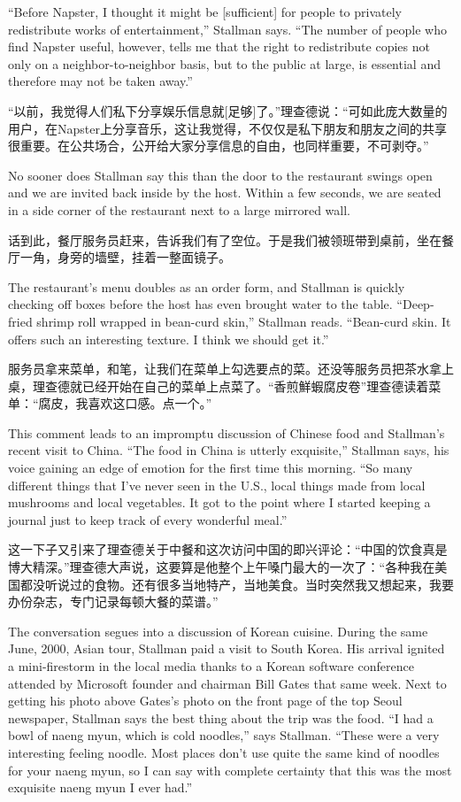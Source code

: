 \ifdefined\eng
``Before Napster, I thought it might be [sufficient] for people to privately redistribute works of entertainment,'' Stallman says. ``The number of people who find Napster useful, however, tells me that the right to redistribute copies not only on a neighbor-to-neighbor basis, but to the public at large, is essential and therefore may not be taken away.''
\fi

\ifdefined\chs
“以前，我觉得人们私下分享娱乐信息就[足够]了。”理查德说：“可如此庞大数量的用户，在Napster上分享音乐，这让我觉得，不仅仅是私下朋友和朋友之间的共享很重要。在公共场合，公开给大家分享信息的自由，也同样重要，不可剥夺。”
\fi

\ifdefined\eng
No sooner does Stallman say this than the door to the restaurant swings open and we are invited back inside by the host. Within a few seconds, we are seated in a side corner of the restaurant next to a large mirrored wall.
\fi

\ifdefined\chs
话到此，餐厅服务员赶来，告诉我们有了空位。于是我们被领班带到桌前，坐在餐厅一角，身旁的墙壁，挂着一整面镜子。
\fi

\ifdefined\eng
The restaurant's menu doubles as an order form, and Stallman is quickly checking off boxes before the host has even brought water to the table. ``Deep-fried shrimp roll wrapped in bean-curd skin,'' Stallman reads. ``Bean-curd skin. It offers such an interesting texture. I think we should get it.''
\fi

\ifdefined\chs
服务员拿来菜单，和笔，让我们在菜单上勾选要点的菜。还没等服务员把茶水拿上桌，理查德就已经开始在自己的菜单上点菜了。“香煎鮮蝦腐皮卷”理查德读着菜单：“腐皮，我喜欢这口感。点一个。”
\fi

\ifdefined\eng
This comment leads to an impromptu discussion of Chinese food and Stallman's recent visit to China. ``The food in China is utterly exquisite,'' Stallman says, his voice gaining an edge of emotion for the first time this morning. ``So many different things that I've never seen in the U.S., local things made from local mushrooms and local vegetables. It got to the point where I started keeping a journal just to keep track of every wonderful meal.''
\fi

\ifdefined\chs
这一下子又引来了理查德关于中餐和这次访问中国的即兴评论：“中国的饮食真是博大精深。”理查德大声说，这要算是他整个上午嗓门最大的一次了：“各种我在美国都没听说过的食物。还有很多当地特产，当地美食。当时突然我又想起来，我要办份杂志，专门记录每顿大餐的菜谱。”
\fi

\ifdefined\eng
The conversation segues into a discussion of Korean cuisine. During the same June, 2000, Asian tour, Stallman paid a visit to South Korea. His arrival ignited a mini-firestorm in the local media thanks to a Korean software conference attended by Microsoft founder and chairman Bill Gates that same week. Next to getting his photo above Gates's photo on the front page of the top Seoul newspaper, Stallman says the best thing about the trip was the food. ``I had a bowl of naeng myun, which is cold noodles,'' says Stallman. ``These were a very interesting feeling noodle. Most places don't use quite the same kind of noodles for your naeng myun, so I can say with complete certainty that this was the most exquisite naeng myun I ever had.''
\fi

